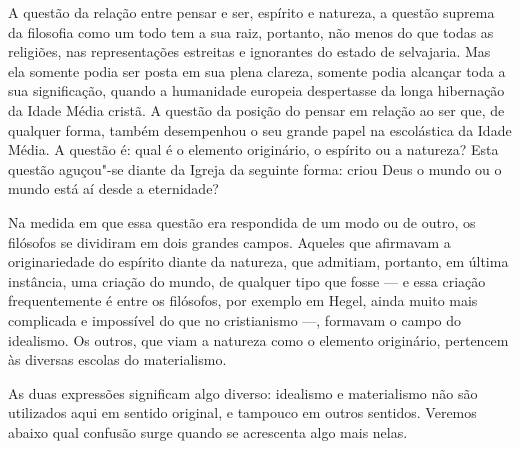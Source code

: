A questão da relação entre pensar e ser, espírito e natureza, a questão
suprema da filosofia como um todo tem a sua raiz, portanto, não menos
do que todas as religiões, nas representações estreitas e ignorantes do
estado de selvajaria. Mas ela somente podia ser posta em sua plena %
clareza, somente podia alcançar toda a sua significação, quando a
humanidade europeia despertasse da longa hibernação da Idade Média
cristã. A questão da posição do pensar em relação ao ser que, de
qualquer forma, também desempenhou o seu grande papel na escolástica da
Idade Média. A questão é: qual é o elemento originário, o espírito ou a
natureza? Esta questão aguçou"-se diante da Igreja da seguinte forma:
criou Deus o mundo ou o mundo está aí desde a eternidade?

Na medida em que essa questão era respondida de um modo ou de outro, os
filósofos se dividiram em dois grandes campos. Aqueles que afirmavam a
originariedade do espírito diante da natureza, que admitiam, portanto, %
em última instância, uma criação do mundo, de qualquer tipo que fosse ---
e essa criação frequentemente é entre os filósofos, por exemplo
em Hegel,
ainda muito mais complicada e impossível do que no cristianismo ---,
formavam o campo do idealismo. Os outros, que viam a natureza como o
elemento originário, pertencem às diversas escolas do materialismo. %

As duas expressões significam algo diverso: idealismo e materialismo não
são utilizados aqui em sentido original, e tampouco em outros sentidos.
Veremos abaixo qual confusão surge quando se acrescenta algo mais nelas.


